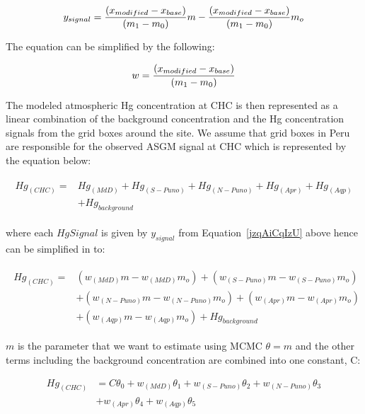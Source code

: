 \begin{equation}
\label{jzqAiCqIzU}
\small{y_{signal}} =\small\frac{(x_{modified} -x_{base})}{(m_1 -m_0)}m -\small\frac{(x_{modified} -x_{base})}{(m_1 -m_0)}m_o
\end{equation}



The equation can be simplified by the following:

\begin{equation}
\label{LjJwnQMt2P}
w=\small\frac{(x_{modified} -x_{base})}{(m_1 -m_0)}
\end{equation}



The modeled atmospheric Hg concentration at CHC is then represented as a linear combination of the background concentration and the Hg concentration signals from the grid boxes around the site. We assume that grid boxes in Peru are responsible for the observed ASGM signal at CHC which is represented by the equation below:

\begin{align}
\begin{split}\label{oqWtdKQu1C}
Hg_{(CHC)}= {}&Hg_{(MdD )}+ Hg_{(S -Puno)} + Hg_{(N -Puno)} + Hg_{(Apr)}+ Hg_{(Aqp)}\\
            & +Hg_{background}
\end{split}
\end{align}

where each $HgSignal$ is given by $y_{signal}$ from Equation~\ref{jzqAiCqIzU} above hence can be simplified in to:



\begin{align}
\begin{split}\label{Cs36PoGd2l}
Hg_{(CHC)}={}& (w_{(MdD)}m -w_{(MdD)}m_o)+ (w_{(S-Puno)}m -w_{(S-Puno)}m_o) \\
            &+ (w_{(N-Puno)}m -w_{(N-Puno)}m_o) + (w_{(Apr)}m -w_{(Apr)}m_o) \\
            &+ (w_{(Aqp)}m -w_{(Aqp)}m_o)+Hg_{background}
\end{split}
\end{align}



$m$ is the parameter that we want to estimate using MCMC $\theta=m$ and the other terms including the background concentration are combined into one constant, C:




\begin{equation}
\begin{aligned}
    Hg_{(CHC)}  & = C \theta_0 + w_{(MdD)} \theta_1+ w_{(S-Puno)} \theta_2 + w_{(N-Puno)} \theta_3 \\
                & + w_{(Apr)} \theta_4+  w_{(Aqp)} \theta_5
\end{aligned}
\end{equation}



